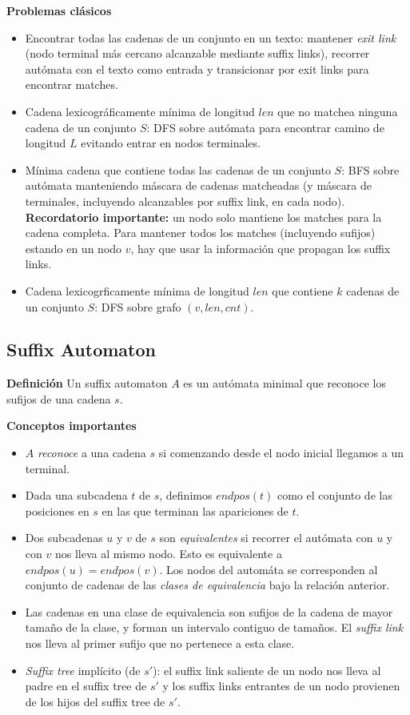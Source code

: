 \textbf{Problemas clásicos}
\begin{itemize}
	\item Encontrar todas las cadenas de un conjunto en un texto: mantener \emph{exit link}
	(nodo terminal más cercano alcanzable mediante suffix links), recorrer autómata con el 
	texto como entrada y transicionar por exit links para encontrar matches.
	\item Cadena lexicográficamente mínima de longitud $len$ que no matchea ninguna 
	cadena de un conjunto $S$: DFS sobre autómata para encontrar camino de longitud $L$
	evitando entrar en nodos terminales.
	\item Mínima cadena que contiene todas las cadenas de un conjunto $S$: BFS sobre 
	autómata manteniendo máscara de cadenas matcheadas (y máscara de terminales,
	incluyendo alcanzables por suffix link, en cada nodo). 
	\textbf{Recordatorio importante: } un nodo solo mantiene los matches para la cadena
	completa. Para mantener todos los matches (incluyendo sufijos) estando en un nodo 
	$v$, hay que usar la información que propagan los suffix links.
	\item Cadena lexicogrficamente mínima de longitud $len$ que contiene $k$ cadenas
	de un conjunto $S$: DFS sobre grafo $(v, len, cnt)$.
\end{itemize}

\subsection{Suffix Automaton}
\textbf{Definición}
Un suffix automaton $A$ es un autómata minimal que reconoce los sufijos de una 
cadena $s$.

\textbf{Conceptos importantes}
\begin{itemize}
	\item $A$ \emph{reconoce} a una cadena $s$ si comenzando desde el nodo inicial llegamos a un 
	terminal.

	\item Dada una subcadena $t$ de $s$, definimos $endpos(t)$ como el conjunto de las posiciones
	en $s$ en las que terminan las apariciones de $t$.
	
    \item Dos subcadenas $u$ y $v$ de $s$ son \emph{equivalentes} si recorrer el autómata con $u$ 
    y con $v$ nos lleva al mismo nodo. Esto es equivalente a $endpos(u) = endpos(v)$. Los nodos del 
    automáta se corresponden al conjunto de cadenas de las \emph{clases de equivalencia} bajo la
    relación anterior.

    \item Las cadenas en una clase de equivalencia son sufijos de la cadena de mayor tamaño de la 
    clase, y forman un intervalo contiguo de tamaños. El \emph{suffix link} nos lleva al primer sufijo 
    que no pertenece a esta clase.
    
    \item \emph{Suffix tree} implícito (de $s'$): el suffix link saliente de un nodo nos lleva al padre 
    en el suffix tree de $s'$ y los suffix links entrantes de un nodo provienen de los hijos del suffix 
    tree de $s'$.
    
\end{itemize}

